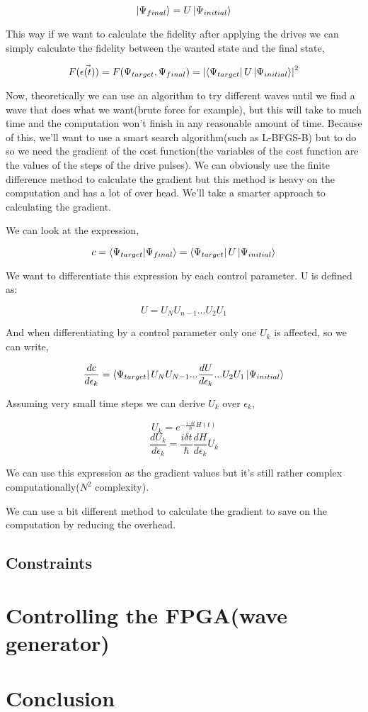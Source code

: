 \documentclass{article}
\begin{document}
$$\ket{\Psi_{final}} = U\ket{\Psi_{initial}}$$

This way if we want to calculate the fidelity after applying the drives we can simply calculate the fidelity between the wanted state and the final state,

$$F(\Vec{\epsilon(t)}) = F(\Psi_{target}, \Psi_{final}) = \abs{\bra{\Psi_{target}}U\ket{\Psi_{initial}}}^2$$

Now, theoretically we can use an algorithm to try different waves until we find a wave that does what we want(brute force for example), but this will take to much time and the computation won't finish in any reasonable amount of time. Because of this, we'll want to use a smart search algorithm(such as L-BFGS-B) but to do so we need the gradient of the cost function(the variables of the cost function are the values of the steps of the drive pulses). We can obviously use the finite difference method to calculate the gradient but this method is heavy on the computation and has a lot of over head. We'll take a smarter approach to calculating the gradient.\par
We can look at the expression,  %

$$c = \braket{\Psi_{target}}{\Psi_{final}} = \bra{\Psi_{target}}U\ket{\Psi_{initial}}$$

We want to differentiate this expression by each control parameter. U is defined as:

$$U = U_N U_{n-1}...U_2 U_1$$

And when differentiating by a control parameter only one $U_k$ is affected, so we can write,

$$\frac{dc}{d\epsilon_k} = \bra{\Psi_{target}}U_N U_{N-1}...\frac{dU}{d\epsilon_k}...U_2 U_1\ket{\Psi_{initial}} $$

Assuming very small time steps we can derive $U_k$ over $\epsilon_k$,

$$U_k = e^{-\frac{i\cdot \delta t}{\hbar}H(t)}$$
$$\frac{dU_k}{d\epsilon_k} = \frac{i \delta t}{\hbar}\frac{dH}{d\epsilon_k} U_k$$

We can use this expression as the gradient values but it's still rather complex computationally($N^2$ complexity).\par
We can use a bit different method to calculate the gradient to save on the computation by reducing the overhead.


\subsection{Constraints}

\newpage
\section{Controlling the FPGA(wave generator)}

\newpage
\section{Conclusion}


\newpage
\end{document}
